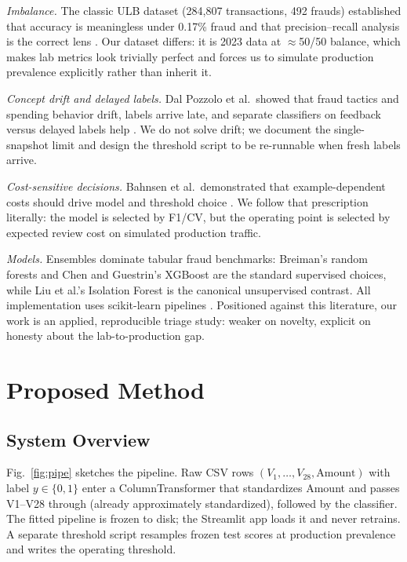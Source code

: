\documentclass[conference]{IEEEtran}
\begin{document}
\emph{Imbalance.} The classic ULB dataset (284,807 transactions, 492
frauds) established that accuracy is meaningless under 0.17\% fraud
and that precision--recall analysis is the correct lens
\cite{pozzi2015,calibrating2015,saito2015}. Our dataset differs: it is
2023 data at $\approx$50/50 balance, which makes lab metrics look
trivially perfect and forces us to simulate production prevalence
explicitly rather than inherit it.

\emph{Concept drift and delayed labels.} Dal Pozzolo et al.\ showed
that fraud tactics and spending behavior drift, labels arrive late,
and separate classifiers on feedback versus delayed labels help
\cite{pozzi2015,lessons2014}. We do not solve drift; we document the
single-snapshot limit and design the threshold script to be re-runnable
when fresh labels arrive.

\emph{Cost-sensitive decisions.} Bahnsen et al.\ demonstrated that
example-dependent costs should drive model and threshold choice
\cite{bahnsen2015}. We follow that prescription literally: the model
is selected by F1/CV, but the operating point is selected by expected
review cost on simulated production traffic.

\emph{Models.} Ensembles dominate tabular fraud benchmarks: Breiman's
random forests \cite{breiman2001} and Chen and Guestrin's XGBoost
\cite{xgboost2016} are the standard supervised choices, while Liu et
al.'s Isolation Forest \cite{isolation2008} is the canonical
unsupervised contrast. All implementation uses scikit-learn pipelines
\cite{sklearn2011}. Positioned against this literature, our work is
an applied, reproducible triage study: weaker on novelty, explicit on
honesty about the lab-to-production gap.

\section{Proposed Method}
\subsection{System Overview}
Fig.~\ref{fig:pipe} sketches the pipeline. Raw CSV rows $(V_1,\dots,
V_{28}, \mathrm{Amount})$ with label $y \in \{0,1\}$ enter a
ColumnTransformer that standardizes Amount and passes V1--V28 through
(already approximately standardized), followed by the classifier. The
fitted pipeline is frozen to disk; the Streamlit app loads it and
never retrains. A separate threshold script resamples frozen test
scores at production prevalence and writes the operating threshold.
\end{document}
